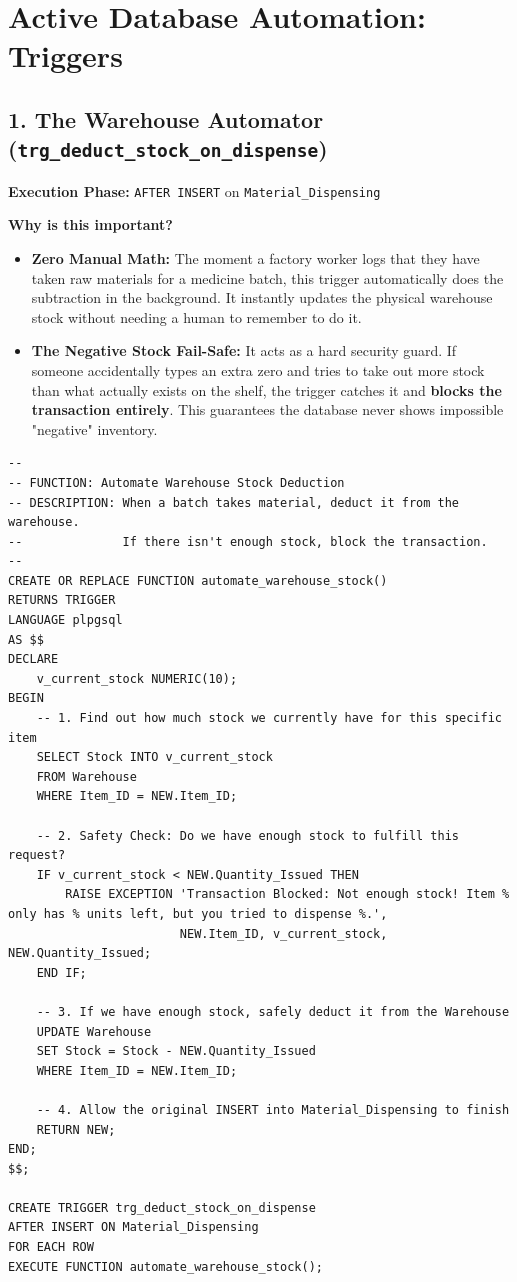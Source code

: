 \documentclass[12pt, a4paper]{article}
\begin{document}
\newpage
\section{Active Database Automation: Triggers}

\subsection{1. The Warehouse Automator (\texttt{trg\_deduct\_stock\_on\_dispense})}
\textbf{Execution Phase:} \texttt{AFTER INSERT} on \texttt{Material\_Dispensing}

\textbf{Why is this important?}
\begin{itemize}
    \item[$\rightarrow$] \textbf{Zero Manual Math:} The moment a factory worker logs that they have taken raw materials for a medicine batch, this trigger automatically does the subtraction in the background. It instantly updates the physical warehouse stock without needing a human to remember to do it.
    \item[$\rightarrow$] \textbf{The Negative Stock Fail-Safe:} It acts as a hard security guard. If someone accidentally types an extra zero and tries to take out more stock than what actually exists on the shelf, the trigger catches it and \textbf{blocks the transaction entirely}. This guarantees the database never shows impossible "negative" inventory.
\end{itemize}

\begin{lstlisting}
-- 
-- FUNCTION: Automate Warehouse Stock Deduction
-- DESCRIPTION: When a batch takes material, deduct it from the warehouse.
--              If there isn't enough stock, block the transaction.
-- 
CREATE OR REPLACE FUNCTION automate_warehouse_stock()
RETURNS TRIGGER 
LANGUAGE plpgsql
AS $$
DECLARE
    v_current_stock NUMERIC(10);
BEGIN
    -- 1. Find out how much stock we currently have for this specific item
    SELECT Stock INTO v_current_stock 
    FROM Warehouse 
    WHERE Item_ID = NEW.Item_ID;

    -- 2. Safety Check: Do we have enough stock to fulfill this request?
    IF v_current_stock < NEW.Quantity_Issued THEN
        RAISE EXCEPTION 'Transaction Blocked: Not enough stock! Item % only has % units left, but you tried to dispense %.', 
                        NEW.Item_ID, v_current_stock, NEW.Quantity_Issued;
    END IF;

    -- 3. If we have enough stock, safely deduct it from the Warehouse
    UPDATE Warehouse
    SET Stock = Stock - NEW.Quantity_Issued
    WHERE Item_ID = NEW.Item_ID;

    -- 4. Allow the original INSERT into Material_Dispensing to finish
    RETURN NEW;
END;
$$;

CREATE TRIGGER trg_deduct_stock_on_dispense
AFTER INSERT ON Material_Dispensing
FOR EACH ROW
EXECUTE FUNCTION automate_warehouse_stock();
\end{lstlisting}
\end{document}
